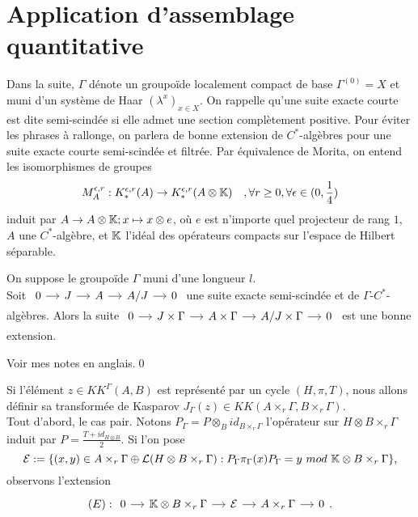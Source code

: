 \section{Application d'assemblage quantitative}

Dans la suite, $\Gamma$ dénote un groupoïde localement compact de base $\Gamma^{(0)}=X$ et muni d'un système de Haar $(\lambda^x)_{x\in X}$. On rappelle qu'une suite exacte courte est dite semi-scindée si elle admet une section complètement positive. Pour éviter les phrases à rallonge, on parlera de bonne extension de $C^*$-algèbres pour une suite exacte courte semi-scindée et filtrée. Par équivalence de Morita, on entend les isomorphismes de groupes 
\[M_A^{\epsilon , r} : K_*^{\epsilon, r }(A)\rightarrow K_*^{\epsilon,r}(A\otimes \mathbb K)\quad, \forall r\geq 0,\forall \epsilon\in (0,\frac{1}{4})\]
induit par $A\rightarrow A\otimes \mathbb K ; x\mapsto x\otimes e$, où $e$ est n'importe quel projecteur de rang $1$, $A$ une $C^*$-algèbre, et $\mathbb K$ l'idéal des opérateurs compacts sur l'espace de Hilbert séparable.\\

\begin{lem} On suppose le groupoïde $\Gamma$ muni d'une longueur $l$.\\
Soit 
$\begin{tikzcd}[column sep = small]
0 \arrow{r} & J\arrow{r}& A \arrow{r} & A/J \arrow{r} & 0
\end{tikzcd}$ une suite exacte semi-scindée et de $\Gamma$-$C^*$-algèbres. Alors la suite 
$\begin{tikzcd}[column sep = small]
0 \arrow{r} & J\times \Gamma\arrow{r}& A\times \Gamma \arrow{r} & A/J\times \Gamma \arrow{r} & 0
\end{tikzcd}$ est une bonne extension.
\end{lem}

\begin{dem}
Voir mes notes en anglais.\qed
\end{dem}

Si l'élément $z\in KK^\Gamma(A,B)$ est représenté par un cycle $(H,\pi,T)$, nous allons définir sa transformée de Kasparov $J_\Gamma(z)\in KK(A\times_r \Gamma, B\times_r\Gamma)$. \\

Tout d'abord, le cas pair. Notons $P_\Gamma=P\otimes_B id_{B\times_r \Gamma}$ l'opérateur sur $H\otimes B\times_r \Gamma$ induit par $P=\frac{T+id_{H\otimes B}}{2}$. Si l'on pose 
\[\mathcal E :=\{(x,y)\in A\times_r \Gamma \oplus \mathcal L (H\otimes B\times_r \Gamma) : P_\Gamma \pi_\Gamma(x) P_\Gamma = y \ mod \ \mathbb K\otimes B\times_r \Gamma\}, \]
observons l'extension
\[(E): \begin{tikzcd}[column sep = small]
0\arrow{r} & \K \otimes B\times_r \Gamma \arrow{r} & \mathcal E \arrow{r} & A\times_r \Gamma \arrow{r} & 0
\end{tikzcd}.\] 

